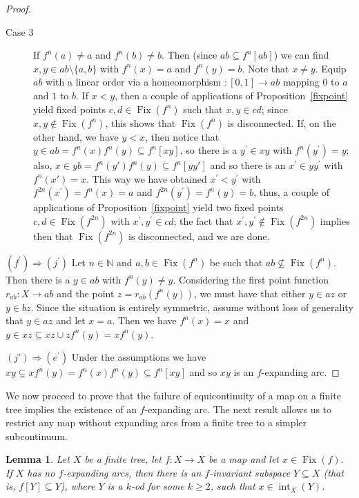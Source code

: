 \documentclass[12pt]{amsart}
\newtheorem{lemma}[theorem]{Lemma}
\theoremstyle{definition}
\numberwithin{equation}{section}
\DeclareMathOperator{\fix}{Fix}
\renewcommand{\int}{\mathop{\mathrm{int}}}
\begin{document}
\begin{proof}
\begin{description}
\item[Case 3]  If $f^n(a)\neq a$ and $f^n(b)\neq b$. Then (since $ab\subseteq f^n[ab]$) we can find 
$x,y\in ab\setminus\{a,b\}$ with $f^n(x)=a$ and $f^n(y)=b$. Note that $x \ne y$. Equip $ab$ with a 
linear order via a homeomorphism $:[0,1]\longrightarrow ab$ mapping $0$ to $a$ and $1$ to $b$. If $x< y$, then a couple of applications of Proposition~\ref{fixpoint} yield fixed points $c,d\in\fix(f^n)$ such that $x,y\in cd$; since $x,y\notin\fix(f^n)$, this shows that $\fix(f^n)$ is disconnected. If, on the other hand, we have $y < x$, then notice 
that $y\in ab=f^n(x)f^n(y)\subseteq f^n[xy]$, so there is a $y^\prime \in xy$ with $f^n(y^\prime)=y$; also, 
$x\in yb=f^n(y')f^n(y)\subseteq f^n[yy']$ and so there is an $x^\prime \in yy^\prime$ with $f^n(x')=x$. This way we have obtained $x^\prime < y^\prime$ with $f^{2n}(x^\prime)=f^n(x)=a$ and $f^{2n}(y^\prime)=f^n(y)=b$, thus, a couple of applications of Proposition~\ref{fixpoint} yield two fixed points $c,d\in\fix(f^{2n})$ with 
$x^\prime,y^\prime \in cd$; the fact that $x^\prime,y^\prime \notin\fix(f^{2n})$ implies then that $\fix(f^{2n})$ is disconnected, and we are done.
\end{description}

\noindent $(f^\prime) \Rightarrow (j^\prime)$ Let $n\in\mathbb N$ and $a,b\in\fix(f^n)$ be such that $ab\nsubseteq\fix(f^n)$. Then there is a $y\in ab$ with $f^n(y)\neq y$. Considering the first point function $r_{ab} \colon X\longrightarrow ab$ and the point $z=r_{ab}(f^n(y))$, we must have that either $y\in az$ or $y\in bz$. Since the situation is entirely symmetric, assume without loss of generality that $y\in az$ and let $x=a$. Then we have $f^n(x)=x$ and $y\in xz\subseteq xz\cup zf^n(y)=xf^n(y)$.

\noindent $(j')\Rightarrow (e^\prime)$ Under the assumptions we have $xy\subsetneq x f^n(y)=f^n(x) f^n(y)\subseteq f^n[xy]$ and so $xy$ is an $f$-expanding arc.
\end{proof}

We now proceed to prove that the failure of equicontinuity of a map on a finite tree implies the existence of an 
$f$-expanding arc. The next result allows us to restrict any map without expanding arcs from a 
finite tree to a simpler subcontinuum.

\begin{lemma}\label{tree-to-dendrite}
Let $X$ be a finite tree, let $f \colon X\longrightarrow X$ be a map and let $x \in \fix(f).$ If $X$ has 
no $f$-expanding arcs, then there is an $f$-invariant subspace $Y\subseteq X$ \emph{(}that is, $f[Y]\subseteq Y$\emph{)}, where $Y$ is a $k$-od for some $k \geq 2$, such that $x \in \int_X(Y)$.
\end{lemma}
\end{document}
